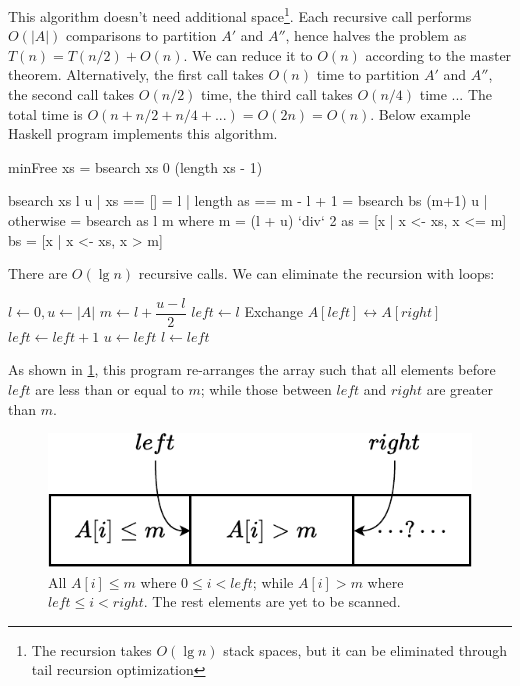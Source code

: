 \documentclass[b5paper]{article}
\begin{document}
This algorithm doesn't need additional space\footnote{The recursion takes $O(\lg n)$ stack spaces, but it can be eliminated through tail recursion optimization}. Each recursive call performs $O(|A|)$ comparisons to partition $A'$ and $A''$, hence halves the problem as $T(n) = T(n/2) + O(n)$. We can reduce it to $O(n)$ according to the master theorem. Alternatively, the first call takes $O(n)$ time to partition $A'$ and $A''$, the second call takes $O(n/2)$ time, the third call takes $O(n/4)$ time ... The total time is $O(n + n/2 + n/4 + ...) = O(2n) = O(n)$. Below example Haskell program implements this algorithm.

\lstset{frame = single}
\begin{Haskell}
minFree xs = bsearch xs 0 (length xs - 1)

bsearch xs l u | xs == [] = l
               | length as == m - l + 1 = bsearch bs (m+1) u
               | otherwise = bsearch as l m
    where
      m = (l + u) `div` 2
      as = [x | x <- xs, x <= m]
      bs = [x | x <- xs, x > m]
\end{Haskell}

There are $O(\lg n)$ recursive calls. We can eliminate the recursion with loops:

\begin{algorithmic}[1]
  \State $l \gets 0, u \gets |A|$
    \State $m \gets l + \dfrac{u - l}{2}$
    \State $left \gets l$
        \State Exchange $A[left] \leftrightarrow A[right]$
        \State $left \gets left + 1$
      \EndIf
    \EndFor
      \State $u \gets left$
    \Else
      \State $l \gets left$
    \EndIf
  \EndWhile
\EndFunction
\end{algorithmic}

As shown in \cref{fig:divide}, this program re-arranges the array such that all elements before $left$ are less than or equal to $m$; while those between $left$ and $right$ are greater than $m$.

\begin{figure}[htbp]
  \centering
  \includegraphics[scale=0.7]{img/partition-by}
  \caption{All $A[i] \leq m$ where $0 \leq i < left$; while $A[i] > m$ where $left \leq i < right$. The rest elements are yet to be scanned.}
  \label{fig:divide}
\end{figure}
\end{document}

